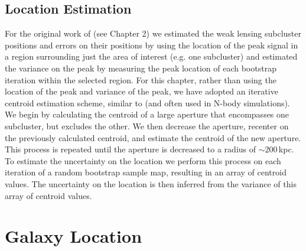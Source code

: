 \subsection{Location Estimation}\label{section:LocationEstimation}
For the original work of \citet{Dawson:2012dl} (see Chapter 2) we estimated the weak lensing subcluster positions and errors on their positions by using the location of the peak signal in a region surrounding just the area of interest (e.g. one subcluster) and estimated the variance on the peak by measuring the peak location of each bootstrap iteration within the selected region.  
For this chapter, rather than using the location of the peak and variance of the peak, we have adopted an iterative centroid estimation scheme, similar to \citet{Randall:2008hs} (and often used in N-body simulations). 
We begin by calculating the centroid of a large aperture that encompasses one subcluster, but excludes the other.
We then decrease the aperture, recenter on the previously calculated centroid, and estimate the centroid of the new aperture.
This process is repeated until the aperture is decreased to a radius of $\sim200$\,kpc.
To estimate the uncertainty on the location we perform this process on each iteration of a random bootstrap sample map, resulting in an array of centroid values.
The uncertainty on the location is then inferred from the variance of this array of centroid values.


\section{Galaxy Location}\label{section:GalaxyLocation}

